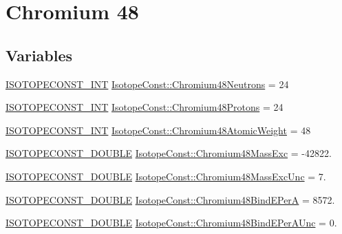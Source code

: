\hypertarget{group___isotope_const-_chromium-_cr48}{}\section{Chromium 48}
\label{group___isotope_const-_chromium-_cr48}
\subsection*{Variables}
\begin{DoxyCompactItemize}
\item 
\mbox{\hyperlink{group___isotope_const-_macros_ga5f18360b3e99483a35c32d789e62621c}{I\+S\+O\+T\+O\+P\+E\+C\+O\+N\+S\+T\+\_\+\+I\+NT}} \mbox{\hyperlink{group___isotope_const-_chromium-_cr48_gaf6c5e08bd65e12f977b7190924f707b0}{Isotope\+Const\+::\+Chromium48\+Neutrons}} = 24
\item 
\mbox{\hyperlink{group___isotope_const-_macros_ga5f18360b3e99483a35c32d789e62621c}{I\+S\+O\+T\+O\+P\+E\+C\+O\+N\+S\+T\+\_\+\+I\+NT}} \mbox{\hyperlink{group___isotope_const-_chromium-_cr48_ga4d509c46efc31cc4774e9ce50ab279cc}{Isotope\+Const\+::\+Chromium48\+Protons}} = 24
\item 
\mbox{\hyperlink{group___isotope_const-_macros_ga5f18360b3e99483a35c32d789e62621c}{I\+S\+O\+T\+O\+P\+E\+C\+O\+N\+S\+T\+\_\+\+I\+NT}} \mbox{\hyperlink{group___isotope_const-_chromium-_cr48_gac917ae9e169959da1f44bed4640537b6}{Isotope\+Const\+::\+Chromium48\+Atomic\+Weight}} = 48
\item 
\mbox{\hyperlink{group___isotope_const-_macros_ga8f45a7272ce02c0b4c65c44636ed719a}{I\+S\+O\+T\+O\+P\+E\+C\+O\+N\+S\+T\+\_\+\+D\+O\+U\+B\+LE}} \mbox{\hyperlink{group___isotope_const-_chromium-_cr48_gac75ea9d71f1759f1c62c2e2ea633ecb2}{Isotope\+Const\+::\+Chromium48\+Mass\+Exc}} = -\/42822.
\item 
\mbox{\hyperlink{group___isotope_const-_macros_ga8f45a7272ce02c0b4c65c44636ed719a}{I\+S\+O\+T\+O\+P\+E\+C\+O\+N\+S\+T\+\_\+\+D\+O\+U\+B\+LE}} \mbox{\hyperlink{group___isotope_const-_chromium-_cr48_ga1bdfe06f70e75d6182abbf8cdcec44ba}{Isotope\+Const\+::\+Chromium48\+Mass\+Exc\+Unc}} = 7.
\item 
\mbox{\hyperlink{group___isotope_const-_macros_ga8f45a7272ce02c0b4c65c44636ed719a}{I\+S\+O\+T\+O\+P\+E\+C\+O\+N\+S\+T\+\_\+\+D\+O\+U\+B\+LE}} \mbox{\hyperlink{group___isotope_const-_chromium-_cr48_gac1007dc0ec883491c2c2189cfcac54ee}{Isotope\+Const\+::\+Chromium48\+Bind\+E\+PerA}} = 8572.
\item 
\mbox{\hyperlink{group___isotope_const-_macros_ga8f45a7272ce02c0b4c65c44636ed719a}{I\+S\+O\+T\+O\+P\+E\+C\+O\+N\+S\+T\+\_\+\+D\+O\+U\+B\+LE}} \mbox{\hyperlink{group___isotope_const-_chromium-_cr48_ga07097e53fd2d615d346c0c5952450637}{Isotope\+Const\+::\+Chromium48\+Bind\+E\+Per\+A\+Unc}} = 0.

\end{DoxyCompactItemize}
